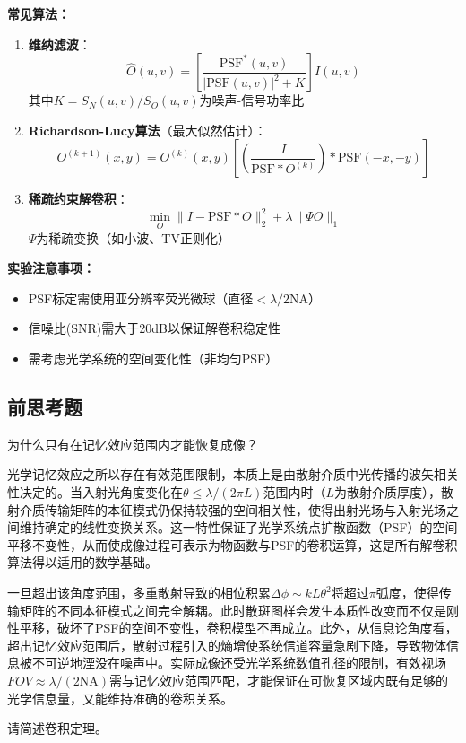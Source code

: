 \textbf{常见算法：}
\begin{enumerate}
    \item \textbf{维纳滤波}：
    \[ \hat{O}(u,v) = \left[ \frac{\text{PSF}^*(u,v)}{|\text{PSF}(u,v)|^2 + K} \right] I(u,v) \]
    其中$K = S_N(u,v)/S_O(u,v)$为噪声-信号功率比
    
    \item \textbf{Richardson-Lucy算法}（最大似然估计）：
    \[ O^{(k+1)}(x,y) = O^{(k)}(x,y) \left[ \left( \frac{I}{\text{PSF}\ast O^{(k)}} \right) \ast \text{PSF}(-x,-y) \right] \]
    
    \item \textbf{稀疏约束解卷积}：
    \[ \min_O \| I - \text{PSF}\ast O \|_2^2 + \lambda \| \Psi O \|_1 \]
    $\Psi$为稀疏变换（如小波、TV正则化）
\end{enumerate}

\textbf{实验注意事项：}
\begin{itemize}
    \item PSF标定需使用亚分辨率荧光微球（直径$<\lambda/2\text{NA}$）
    \item 信噪比(SNR)需大于20dB以保证解卷积稳定性
    \item 需考虑光学系统的空间变化性（非均匀PSF）
\end{itemize}
\subsection{前思考题}
\begin{question}
	为什么只有在记忆效应范围内才能恢复成像？
\end{question}
光学记忆效应之所以存在有效范围限制，本质上是由散射介质中光传播的波矢相关性决定的。当入射光角度变化在$\theta \leq \lambda/(2\pi L)$范围内时（$L$为散射介质厚度），散射介质传输矩阵的本征模式仍保持较强的空间相关性，使得出射光场与入射光场之间维持确定的线性变换关系。这一特性保证了光学系统点扩散函数（PSF）的空间平移不变性，从而使成像过程可表示为物函数与PSF的卷积运算，这是所有解卷积算法得以适用的数学基础。

一旦超出该角度范围，多重散射导致的相位积累$\Delta\phi \sim kL\theta^2$将超过$\pi$弧度，使得传输矩阵的不同本征模式之间完全解耦。此时散斑图样会发生本质性改变而不仅是刚性平移，破坏了PSF的空间不变性，卷积模型不再成立。此外，从信息论角度看，超出记忆效应范围后，散射过程引入的熵增使系统信道容量急剧下降，导致物体信息被不可逆地湮没在噪声中。实际成像还受光学系统数值孔径的限制，有效视场$FOV \approx \lambda/(2\text{NA})$需与记忆效应范围匹配，才能保证在可恢复区域内既有足够的光学信息量，又能维持准确的卷积关系。
\begin{question}
	请简述卷积定理。
\end{question}

